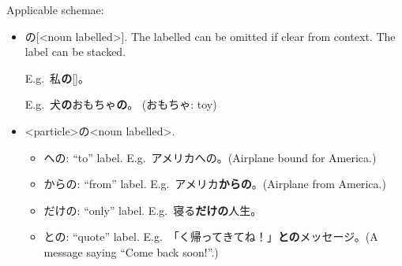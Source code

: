 \documentclass[../nihongo-gakushuu-kyouzai.tex]{subfiles}
\begin{document}
Applicable schemae:
\begin{itemize}
    \item <noun label>の[<noun labelled>]. The labelled can be omitted if clear from context. The label can be stacked.

    E.g.\ 私\textbf{の}[]。

    E.g.\ 犬\textbf{の}おもちゃ\textbf{の}。 (おもちゃ: toy)
    \item <particle>の<noun labelled>.
    \begin{itemize}
        \item への: ``to'' label. E.g.\ アメリカへの。(Airplane bound for America.)
        \item からの: ``from'' label. E.g.\ アメリカ\textbf{からの}。(Airplane from America.)
        \item だけの: ``only'' label. E.g.\ 寝る\textbf{だけの}人生。
        \item との: ``quote'' label. E.g.\ 「く帰ってきてね！」\textbf{との}メッセージ。(A message saying ``Come back soon!''.)
    \end{itemize}
\end{itemize}
\end{document}
